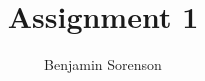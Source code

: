 \documentclass[11pt]{article}  %
\begin{document}
\title{Assignment 1}
\author{Benjamin Sorenson}
\maketitle            


\end{document}
